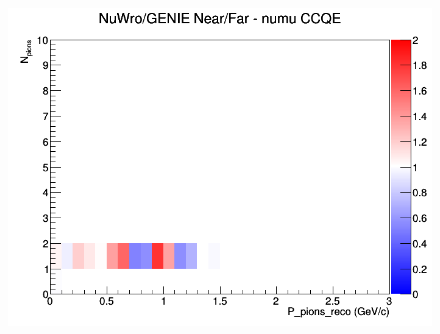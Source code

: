 \documentclass[12pt]{article}
\begin{document}
\begin{figure}[h]
\endminipage
{}
\includegraphics[width=\linewidth]{eff_N_P/GAr/pions/ratios/CCQE_NuWro_GENIE_numu_NF_N_P.png}
\endminipage
\newline
\end{figure}
\clearpage
\end{document}
